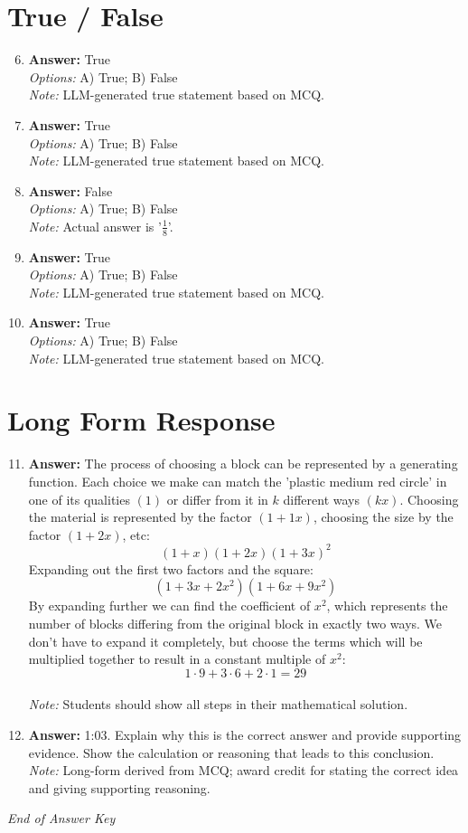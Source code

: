\documentclass[12pt]{article}
\begin{document}
\section*{True / False}
\begin{enumerate}[label=\arabic*.]
\setcounter{enumi}{5}
\item \textbf{Answer:} True
\\ \textit{Options:} A) True; B) False
\\ \textit{Note:} LLM-generated true statement based on MCQ.
\item \textbf{Answer:} True
\\ \textit{Options:} A) True; B) False
\\ \textit{Note:} LLM-generated true statement based on MCQ.
\item \textbf{Answer:} False
\\ \textit{Options:} A) True; B) False
\\ \textit{Note:} Actual answer is '\ensuremath{\frac{1}{8}}'.
\item \textbf{Answer:} True
\\ \textit{Options:} A) True; B) False
\\ \textit{Note:} LLM-generated true statement based on MCQ.
\item \textbf{Answer:} True
\\ \textit{Options:} A) True; B) False
\\ \textit{Note:} LLM-generated true statement based on MCQ.
\end{enumerate}

\section*{Long Form Response}
\begin{enumerate}[label=\arabic*.]
\setcounter{enumi}{10}
\item \textbf{Answer:} The process of choosing a block can be represented by a generating function. Each choice we make can match the 'plastic medium red circle' in one of its qualities $(1)$ or differ from it in $k$ different ways $(kx)$. Choosing the material is represented by the factor $(1+1 x)$, choosing the size by the factor $(1+2 x)$, etc:\[(1+x)(1+2 x)(1+3 x)^2\]Expanding out the first two factors and the square:\[(1+3 x+2 x^2)(1+6 x+9 x^2)\]By expanding further we can find the coefficient of $x^2$, which represents the number of blocks differing from the original block in exactly two ways. We don't have to expand it completely, but choose the terms which will be multiplied together to result in a constant multiple of $x^2$:\[1\cdot 9+3\cdot 6+2\cdot 1=\boxed{29}\]
\\ \textit{Note:} Students should show all steps in their mathematical solution.
\item \textbf{Answer:} 1:03. Explain why this is the correct answer and provide supporting evidence. Show the calculation or reasoning that leads to this conclusion.
\\ \textit{Note:} Long-form derived from MCQ; award credit for stating the correct idea and giving supporting reasoning.
\end{enumerate}

\vfill
\noindent\textit{End of Answer Key}
\end{document}
